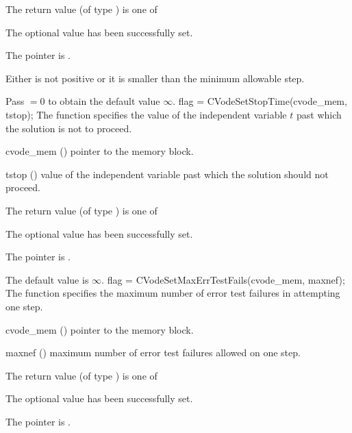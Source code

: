 {
  The return value  (of type ) is one of
  \begin{args}
  \item[\Id{CV\_SUCCESS}] 
    The optional value has been successfully set.
  \item[\Id{CV\_MEM\_NULL}]
    The  pointer is .
  \item[\Id{CV\_ILL\_INPUT}]
    Either  is not positive or it is smaller than the minimum allowable step.
  \end{args}
}
{
  Pass $=0$ to obtain the default value $\infty$.
}
{
flag = CVodeSetStopTime(cvode\_mem, tstop);
}
{
  The function  specifies the value of the
  independent variable $t$ past which the solution is not to proceed.
}
{
  \begin{args}
  \item[cvode\_mem] ()
    pointer to the {\cvode} memory block.
  \item[tstop] ()
    value of the independent variable past which the solution should
    not proceed.
  \end{args}
}
{
  The return value  (of type ) is one of
  \begin{args}
  \item[\Id{CV\_SUCCESS}] 
    The optional value has been successfully set.
  \item[\Id{CV\_MEM\_NULL}]
    The  pointer is .
  \end{args}
}
{
  The default value is $\infty$.
}
{
flag = CVodeSetMaxErrTestFails(cvode\_mem, maxnef);
}
{
  The function  specifies the
  maximum number of error test failures in attempting one step.
}
{
  \begin{args}
  \item[cvode\_mem] ()
    pointer to the {\cvode} memory block.
  \item[maxnef] ()
    maximum number of error test failures allowed on one step.
  \end{args}
}
{
  The return value  (of type ) is one of
  \begin{args}
  \item[\Id{CV\_SUCCESS}] 
    The optional value has been successfully set.
  \item[\Id{CV\_MEM\_NULL}]
    The  pointer is .
  \end{args}
}
